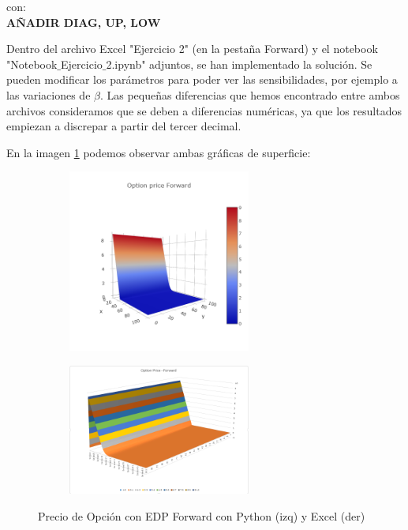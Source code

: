 \documentclass[titlepage, 10pt,]{article}
\begin{document}
con:\\

\textbf{AÑADIR DIAG, UP, LOW}



Dentro del archivo Excel "Ejercicio 2" (en la pestaña Forward) y el notebook "Notebook$\_$Ejercicio$\_$2.ipynb" adjuntos, se han implementado la solución. Se pueden modificar los parámetros para poder ver las sensibilidades, por ejemplo a las variaciones de $\beta$. Las pequeñas diferencias que hemos encontrado entre ambos archivos consideramos que se deben a diferencias numéricas, ya que los resultados empiezan a discrepar a partir del tercer decimal.

\vspace{5pt}
En la imagen \ref{fig: EDP Forward} podemos observar ambas gráficas de superficie:

\begin{figure}
	\begin{subfigure}{7cm}
    	\centering\includegraphics[width=6cm]{PyEDPForward}
  	\end{subfigure}
  	\begin{subfigure}{7cm}
    	\centering\includegraphics[width=6cm]{ExEDPForward}
  	\end{subfigure}
  	\caption{Precio de Opción con EDP Forward con Python (izq) y Excel (der)}
  	\label{fig: EDP Forward}
\end{figure}
\end{document}

